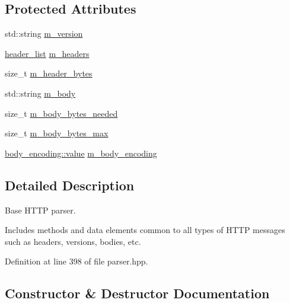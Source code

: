 \subsection*{Protected Attributes}
\begin{DoxyCompactItemize}
\item 
std\+::string \hyperlink{classwebsocketpp_1_1http_1_1parser_1_1parser_a3e8026fc40c96ca8bfa46a533e00d6a6}{m\+\_\+version}
\item 
\hyperlink{namespacewebsocketpp_1_1http_1_1parser_a4bb5b2821dab6a182bfe4c5415229e6e}{header\+\_\+list} \hyperlink{classwebsocketpp_1_1http_1_1parser_1_1parser_ae75e1e6acd17cc5a5543f818a5355a50}{m\+\_\+headers}
\item 
size\+\_\+t \hyperlink{classwebsocketpp_1_1http_1_1parser_1_1parser_ae82ee117b729da521de60401cd17f8d4}{m\+\_\+header\+\_\+bytes}
\item 
std\+::string \hyperlink{classwebsocketpp_1_1http_1_1parser_1_1parser_a2a552a4581ae26674fd6d566e5b332ee}{m\+\_\+body}
\item 
size\+\_\+t \hyperlink{classwebsocketpp_1_1http_1_1parser_1_1parser_a89e6a7583bee97f30c60dc88b4cd29dd}{m\+\_\+body\+\_\+bytes\+\_\+needed}
\item 
size\+\_\+t \hyperlink{classwebsocketpp_1_1http_1_1parser_1_1parser_a85613c9d20e308ff343449852b7e769f}{m\+\_\+body\+\_\+bytes\+\_\+max}
\item 
\hyperlink{namespacewebsocketpp_1_1http_1_1parser_1_1body__encoding_a489de0413246f2f6d2d6a6605af16653}{body\+\_\+encoding\+::value} \hyperlink{classwebsocketpp_1_1http_1_1parser_1_1parser_a286e19d30028f6dbc295ad578e8e50d3}{m\+\_\+body\+\_\+encoding}
\end{DoxyCompactItemize}


\subsection{Detailed Description}
Base H\+T\+T\+P parser. 

Includes methods and data elements common to all types of H\+T\+T\+P messages such as headers, versions, bodies, etc. 

Definition at line 398 of file parser.\+hpp.



\subsection{Constructor \& Destructor Documentation}
\hypertarget{classwebsocketpp_1_1http_1_1parser_1_1parser_a11bc97bfd504dd56ad7b8262a940a9c5}{}
